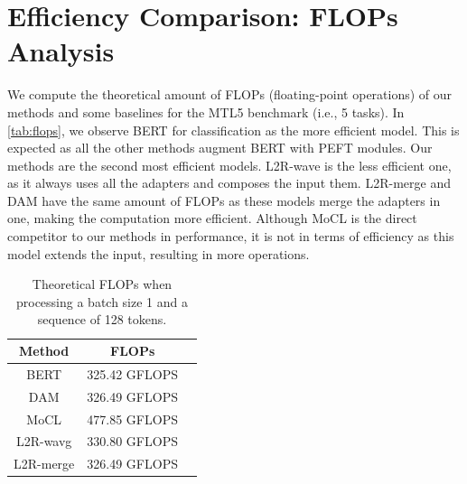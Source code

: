 \documentclass[11pt]{article}
\begin{document}
\section{Efficiency Comparison: FLOPs Analysis}
\label{sec:appendix:efficiency}

We compute the theoretical amount of FLOPs (floating-point operations) of our methods and some baselines for the MTL5 benchmark (i.e., 5 tasks). In \autoref{tab:flops}, we observe BERT for classification as the more efficient model. This is expected as all the other methods augment BERT with PEFT modules. Our methods are the second most efficient models. L2R-wave is the less efficient one, as it always uses all the adapters and composes the input them. L2R-merge and DAM have the same amount of FLOPs as these models merge the adapters in one, making the computation more efficient. Although MoCL is the direct competitor to our methods in performance, it is not in terms of efficiency as this model extends the input, resulting in more operations.


\begin{table}[hbt!]
    \centering
    \begin{tabular}{ccc}
    \hline
        \textbf{Method} & \textbf{FLOPs} \\
    \hline
        BERT & 325.42 GFLOPS \\
        DAM & 326.49 GFLOPS \\
        MoCL & 477.85 GFLOPS \\
        L2R-wavg & 330.80 GFLOPS \\
        L2R-merge & 326.49 GFLOPS \\
    \hline
    \end{tabular}
    \caption{Theoretical FLOPs when processing a batch size 1 and a sequence of 128 tokens.}
    \label{tab:flops}
\end{table}
\end{document}
